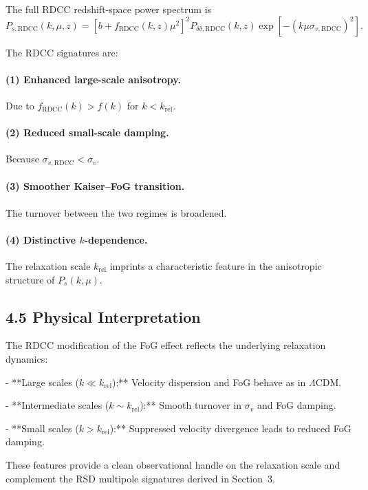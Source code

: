 \documentclass[11pt,a4paper]{article}
\begin{document}
The full RDCC redshift-space power spectrum is
\begin{equation}
P_{s,\mathrm{RDCC}}(k,\mu,z)
=
\left[
b + f_{\mathrm{RDCC}}(k,z)\mu^{2}
\right]^{2}
P_{\delta\delta,\mathrm{RDCC}}(k,z)
\exp\!\left[
- (k\mu\sigma_{v,\mathrm{RDCC}})^{2}
\right].
\end{equation}

The RDCC signatures are:

\paragraph{(1) Enhanced large-scale anisotropy.}
Due to $f_{\mathrm{RDCC}}(k) > f(k)$ for $k < k_{\mathrm{rel}}$.

\paragraph{(2) Reduced small-scale damping.}
Because $\sigma_{v,\mathrm{RDCC}} < \sigma_{v}$.

\paragraph{(3) Smoother Kaiser–FoG transition.}
The turnover between the two regimes is broadened.

\paragraph{(4) Distinctive $k$-dependence.}
The relaxation scale $k_{\mathrm{rel}}$ imprints a characteristic feature in the anisotropic
structure of $P_{s}(k,\mu)$.

\subsection{4.5 Physical Interpretation}

The RDCC modification of the FoG effect reflects the underlying relaxation dynamics:

- **Large scales ($k \ll k_{\mathrm{rel}}$):**  
  Velocity dispersion and FoG behave as in $\Lambda$CDM.

- **Intermediate scales ($k \sim k_{\mathrm{rel}}$):**  
  Smooth turnover in $\sigma_{v}$ and FoG damping.

- **Small scales ($k > k_{\mathrm{rel}}$):**  
  Suppressed velocity divergence leads to reduced FoG damping.

These features provide a clean observational handle on the relaxation scale and complement
the RSD multipole signatures derived in Section~3.
\end{document}
